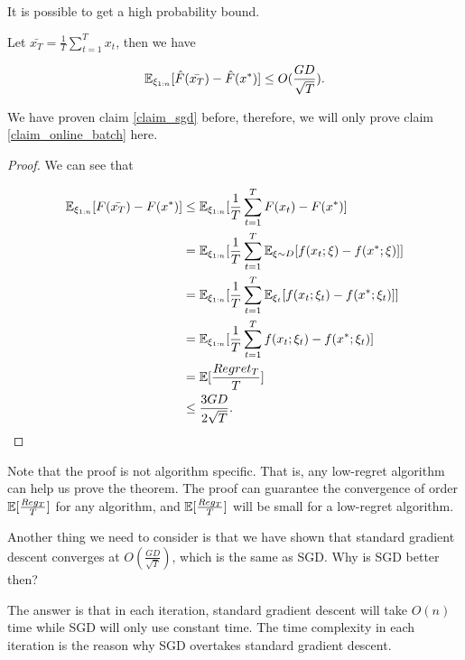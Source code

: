 \documentclass[../main.tex]{subfiles}
\begin{document}
\begin{corollary}
	It is possible to get a high probability bound.
\end{corollary}

\begin{claim}\label{claim_sgd}
	Let $\bar{x_T} = \frac{1}{T} \sum\limits_{t=1}^T x_t$, then we have
	
	\begin{equation}
		\mathbb{E}_{\xi_{1:n}} [\hat{F}(\bar{x_T}) - \hat{F}(x^*)] \leq O(\frac{GD}{\sqrt{T}}).
	\end{equation}
\end{claim}

We have proven claim \ref{claim_sgd} before, therefore, we will only prove claim \ref{claim_online_batch} here.

\begin{proof}
	We can see that 
	
	\begin{equation*}
		\begin{aligned}
			\mathbb{E}_{\xi_{1:n}} [F(\bar{x_T}) - F(x^*)] &\leq \mathbb{E}_{\xi_{1:n}} [\frac{1}{T}\sum\limits_{t=1}^T F(x_t) - F(x^*)] \\
			&= \mathbb{E}_{\xi_{1:n}} [\frac{1}{T}\sum\limits_{t=1}^T \mathbb{E}_{\xi \sim D} [f(x_t;\xi) - f(x^*;\xi)]] \\
			&= \mathbb{E}_{\xi_{1:n}} [\frac{1}{T}\sum\limits_{t=1}^T \mathbb{E}_{\xi_t} [f(x_t;\xi_t) - f(x^*;\xi_t)]] \\ &= \mathbb{E}_{\xi_{1:n}} [\frac{1}{T}\sum\limits_{t=1}^T f(x_t;\xi_t) - f(x^*;\xi_t)] \\
			& = \mathbb{E} [\frac{Regret_T}{T}] \\
			& \leq \frac{3GD}{2\sqrt{T}}.
		\end{aligned}
	\end{equation*}
\end{proof}

Note that the proof is not algorithm specific. That is, any low-regret algorithm can help us prove the theorem. The proof can guarantee the convergence of order $\mathbb{E}[\frac{Reg_T}{T}]$ for any algorithm, and $\mathbb{E}[\frac{Reg_T}{T}]$ will be small for a low-regret algorithm.

Another thing we need to consider is that we have shown that standard gradient descent converges at $O(\frac{GD}{\sqrt{T}})$, which is the same as SGD. Why is SGD better then?

The answer is that in each iteration, standard gradient descent will take $O(n)$ time while SGD will only use constant time. The time complexity in each iteration is the reason why SGD overtakes standard gradient descent.
\end{document}
